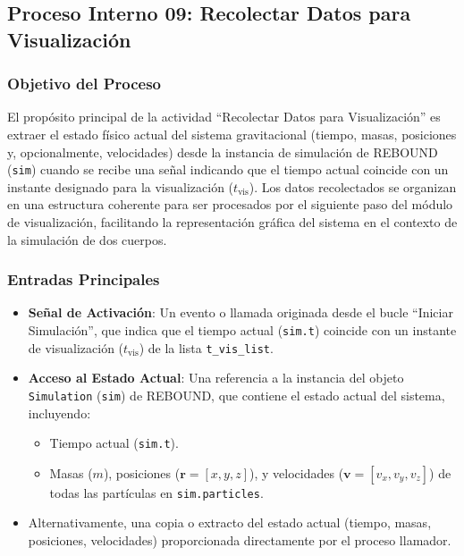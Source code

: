 \subsection[Proceso Interno 09: Recolectar Datos]{Proceso Interno 09: Recolectar Datos para Visualización}

\subsubsection{Objetivo del Proceso}
El propósito principal de la actividad ``Recolectar Datos para Visualización'' es extraer el estado físico actual del sistema gravitacional (tiempo, masas, posiciones y, opcionalmente, velocidades) desde la instancia de simulación de REBOUND (\texttt{sim}) cuando se recibe una señal indicando que el tiempo actual coincide con un instante designado para la visualización ($t_{\text{vis}}$). Los datos recolectados se organizan en una estructura coherente para ser procesados por el siguiente paso del módulo de visualización, facilitando la representación gráfica del sistema en el contexto de la simulación de dos cuerpos.

\subsubsection{Entradas Principales}
\begin{itemize}
    \item \textbf{Señal de Activación}: Un evento o llamada originada desde el bucle ``Iniciar Simulación'', que indica que el tiempo actual (\texttt{sim.t}) coincide con un instante de visualización ($t_{\text{vis}}$) de la lista \texttt{t\_vis\_list}.
    \item \textbf{Acceso al Estado Actual}: Una referencia a la instancia del objeto \texttt{Simulation} (\texttt{sim}) de REBOUND, que contiene el estado actual del sistema, incluyendo:
    \begin{itemize}
        \item Tiempo actual (\texttt{sim.t}).
        \item Masas ($m$), posiciones ($\mathbf{r} = [x, y, z]$), y velocidades ($\mathbf{v} = [v_x, v_y, v_z]$) de todas las partículas en \texttt{sim.particles}.
    \end{itemize}
    \item Alternativamente, una copia o extracto del estado actual (tiempo, masas, posiciones, velocidades) proporcionada directamente por el proceso llamador.
\end{itemize}

